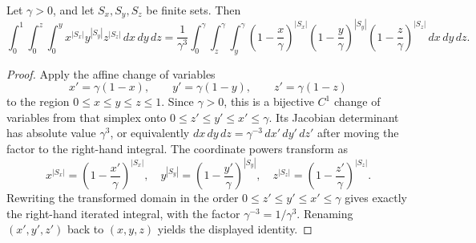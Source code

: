 \begin{helper}
Let \(\gamma>0\), and let \(S_x,S_y,S_z\) be finite sets.  Then
\[
\int_0^1\int_0^z\int_0^y
x^{|S_x|}y^{|S_y|}z^{|S_z|}\,dx\,dy\,dz
=
\frac1{\gamma^3}\int_0^\gamma\int_z^\gamma\int_y^\gamma
\left(1-\frac{x}{\gamma}\right)^{|S_x|}
\left(1-\frac{y}{\gamma}\right)^{|S_y|}
\left(1-\frac{z}{\gamma}\right)^{|S_z|}\,dx\,dy\,dz .
\]
\end{helper}
\begin{proof}
Apply the affine change of variables
\[
x'=\gamma(1-x),\qquad y'=\gamma(1-y),\qquad z'=\gamma(1-z)
\]
to the region \(0\le x\le y\le z\le1\).  Since \(\gamma>0\), this is a
bijective \(C^1\) change of variables from that simplex onto
\(0\le z'\le y'\le x'\le\gamma\).  Its Jacobian determinant has absolute value
\(\gamma^3\), or equivalently \(dx\,dy\,dz=\gamma^{-3}\,dx'\,dy'\,dz'\) after
moving the factor to the right-hand integral.  The coordinate powers transform
as
\[
x^{|S_x|}=\left(1-\frac{x'}{\gamma}\right)^{|S_x|},\quad
y^{|S_y|}=\left(1-\frac{y'}{\gamma}\right)^{|S_y|},\quad
z^{|S_z|}=\left(1-\frac{z'}{\gamma}\right)^{|S_z|}.
\]
Rewriting the transformed domain in the order
\(0\le z'\le y'\le x'\le\gamma\) gives exactly the right-hand iterated
integral, with the factor \(\gamma^{-3}=1/\gamma^3\).  Renaming
\((x',y',z')\) back to \((x,y,z)\) yields the displayed identity.
\end{proof}
